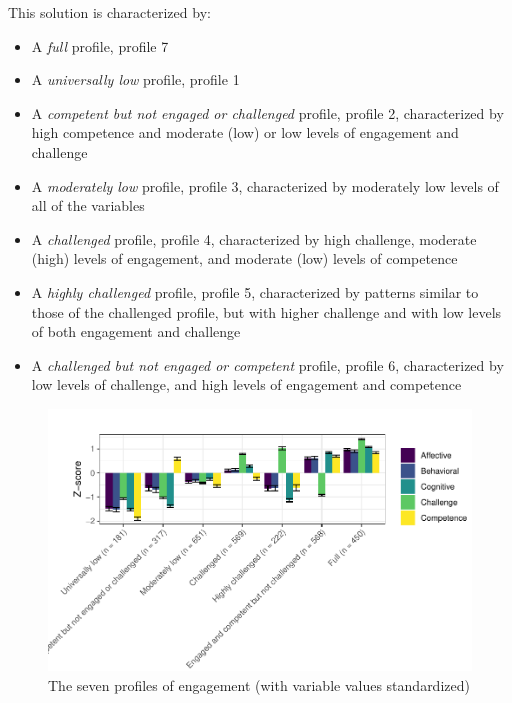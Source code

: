 \documentclass[]{book}
\providecommand{\tightlist}{%
  \setlength{\itemsep}{0pt}\setlength{\parskip}{0pt}}
\theoremstyle{definition}
\theoremstyle{definition}
\theoremstyle{definition}
\theoremstyle{remark}
\begin{document}
This solution is characterized by:

\begin{itemize}
\tightlist
\item
  A \emph{full} profile, profile 7
\item
  A \emph{universally low} profile, profile 1
\item
  A \emph{competent but not engaged or challenged} profile, profile 2,
  characterized by high competence and moderate (low) or low levels of
  engagement and challenge
\item
  A \emph{moderately low} profile, profile 3, characterized by
  moderately low levels of all of the variables
\item
  A \emph{challenged} profile, profile 4, characterized by high
  challenge, moderate (high) levels of engagement, and moderate (low)
  levels of competence
\item
  A \emph{highly challenged} profile, profile 5, characterized by
  patterns similar to those of the challenged profile, but with higher
  challenge and with low levels of both engagement and challenge
\item
  A \emph{challenged but not engaged or competent} profile, profile 6,
  characterized by low levels of challenge, and high levels of
  engagement and competence
\end{itemize}

\begin{figure}

{\centering \includegraphics[width=1\linewidth]{rosenberg-dissertation_files/figure-latex/unnamed-chunk-18-1} 

}

\caption{The seven profiles of engagement (with variable values standardized)}\label{fig:unnamed-chunk-18}
\end{figure}
\end{document}
